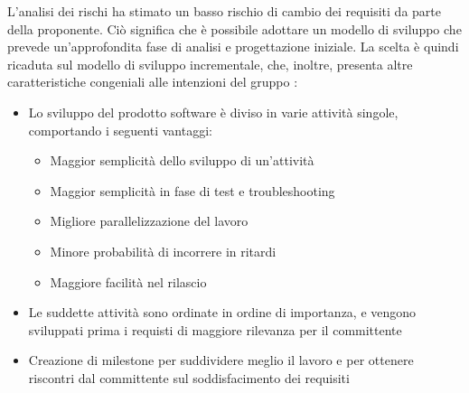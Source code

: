 L'analisi dei rischi ha stimato un basso rischio di cambio dei requisiti da parte della proponente.
Ciò significa che è possibile adottare un modello di sviluppo che prevede un'approfondita fase di 
analisi e progettazione iniziale.
La scelta è quindi ricaduta sul modello di sviluppo incrementale, che, inoltre, presenta altre
caratteristiche congeniali alle intenzioni del gruppo \gruppo \space :
\begin{itemize}
    \item Lo sviluppo del prodotto software è diviso in varie attività singole, comportando i seguenti vantaggi:
    \begin{itemize}
    	\item Maggior semplicità dello sviluppo di un'attività
    	\item Maggior semplicità in fase di test e troubleshooting
    	\item Migliore parallelizzazione del lavoro
    	\item Minore probabilità di incorrere in ritardi
    	\item Maggiore facilità nel rilascio
    \end{itemize}
    \item Le suddette attività sono ordinate in ordine di importanza, e vengono sviluppati prima i requisti di maggiore rilevanza per il committente
    \item Creazione di milestone per suddividere meglio il lavoro e per ottenere riscontri dal committente sul soddisfacimento dei requisiti
\end{itemize}